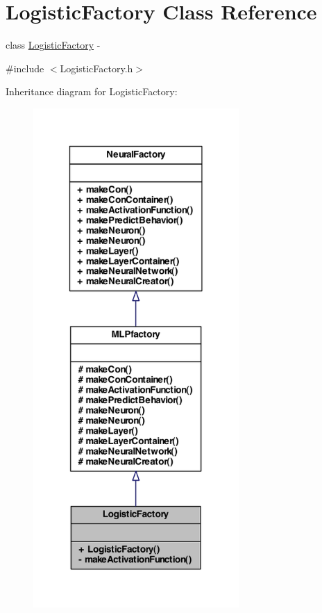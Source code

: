 \hypertarget{class_logistic_factory}{
\section{LogisticFactory Class Reference}
\label{class_logistic_factory}
}


class \hyperlink{class_logistic_factory}{LogisticFactory} -\/  




{\ttfamily \#include $<$LogisticFactory.h$>$}



Inheritance diagram for LogisticFactory:\nopagebreak
\begin{figure}[H]
\begin{center}
\leavevmode
\includegraphics[width=222pt]{class_logistic_factory__inherit__graph}
\end{center}
\end{figure}


